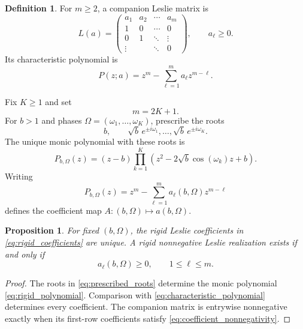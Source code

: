 \documentclass[11pt]{amsart}
\numberwithin{equation}{section}
\theoremstyle{plain}
\newtheorem{proposition}[theorem]{Proposition}
\theoremstyle{definition}
\newtheorem{definition}[theorem]{Definition}
\theoremstyle{remark}
\begin{document}
\begin{definition}
\label{def:leslie_matrix}
For $m\geq2$, a companion Leslie matrix is
\begin{equation}
L(a)=
\begin{pmatrix}
a_1&a_2&\cdots&a_m\\
1&0&\cdots&0\\
0&1&\ddots&\vdots\\
\vdots&&\ddots&0
\end{pmatrix},
\qquad a_\ell\geq0.
\label{eq:leslie_matrix}
\end{equation}
Its characteristic polynomial is
\begin{equation}
P(z;a)=z^m-\sum_{\ell=1}^{m}a_\ell z^{m-\ell}.
\label{eq:characteristic_polynomial}
\end{equation}
\end{definition}

Fix $K\geq1$ and set
\begin{equation}
m=2K+1.
\label{eq:rigid_dimension}
\end{equation}
For $b>1$ and phases $\Omega=(\omega_1,\ldots,\omega_K)$, prescribe the roots
\begin{equation}
b,
\qquad
\sqrt b\,e^{\pm i\omega_1},\ldots,
\sqrt b\,e^{\pm i\omega_K}.
\label{eq:prescribed_roots}
\end{equation}
The unique monic polynomial with these roots is
\begin{equation}
P_{b,\Omega}(z)
=(z-b)\prod_{k=1}^{K}
\left(z^2-2\sqrt b\cos(\omega_k)z+b\right).
\label{eq:rigid_polynomial}
\end{equation}
Writing
\begin{equation}
P_{b,\Omega}(z)
=z^m-\sum_{\ell=1}^{m}a_\ell(b,\Omega)z^{m-\ell}
\label{eq:rigid_coefficients}
\end{equation}
defines the coefficient map $A:(b,\Omega)\mapsto a(b,\Omega)$.

\begin{proposition}
\label{prop:uniqueness}
For fixed $(b,\Omega)$, the rigid Leslie coefficients in \eqref{eq:rigid_coefficients} are unique.  A rigid nonnegative Leslie realization exists if and only if
\begin{equation}
a_\ell(b,\Omega)\geq0,
\qquad 1\leq\ell\leq m.
\label{eq:coefficient_nonnegativity}
\end{equation}
\end{proposition}

\begin{proof}
The roots in \eqref{eq:prescribed_roots} determine the monic polynomial \eqref{eq:rigid_polynomial}.  Comparison with \eqref{eq:characteristic_polynomial} determines every coefficient.  The companion matrix is entrywise nonnegative exactly when its first-row coefficients satisfy \eqref{eq:coefficient_nonnegativity}.
\end{proof}
\end{document}
